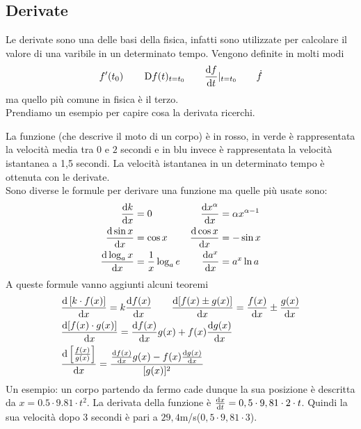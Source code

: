 \subsection{Derivate}
Le derivate sono una delle basi della fisica, infatti sono utilizzate per calcolare il valore di 
una varibile in un determinato tempo. Vengono definite in molti modi 
\begin{equation*}
  f'(t_0) \qquad
  \mathop{}\!\mathrm{D} f(t)_{t=t_0}\qquad
  \frac{\mathop{}\!\mathrm{d} f}{\mathop{}\!\mathrm{d} t}|_{t=t_0}\qquad
  \dot{f}
\end{equation*}
ma quello più comune in fisica è il terzo.\\
Prendiamo un esempio per capire cosa la derivata ricerchi.
\begin{center}
\end{center}
La funzione (che descrive il moto di un corpo) è in rosso, in verde è rappresentata la velocità 
media tra $0$ e $2$ secondi e in blu invece è rappresentata la velocità istantanea a 1,5 secondi. 
La velocità istantanea in un determinato tempo è ottenuta con le derivate.\\
Sono diverse le formule per derivare una funzione ma quelle più usate sono:
\begin{align*}
  \frac{\dif k}{\dif x}&=0 &\quad \frac{\dif x^\alpha}{\dif x}&=\alpha x^{\alpha-1}\\
  \frac{\dif\sin x}{\dif x}&=\cos x & \frac{\dif\cos x}{\dif x}&=-\sin x\\
  \frac{\dif\log_ax}{\dif x}&=\frac{1}{x}\log_ae & \frac{\dif a^{x}}{\dif x}&=a^{x}\ln a
\end{align*}
A queste formule vanno aggiunti alcuni teoremi
\begin{align*}
  &\frac{\dif\left[k\cdot f(x) \right]}{\dif x}=k\frac{\dif f(x)}{\dif x}\qquad
  \frac{\dif[f(x)\pm g(x)]}{\dif x}=\frac{f(x)}{\dif x}\pm \frac{g(x)}{\dif x}\\
  &\frac{\dif [f(x)\cdot g(x)]}{\dif x}=\frac{\dif f(x)}{\dif x}g(x) + 
  f(x)\frac{\dif g(x)}{\dif x}\\
  &\frac{\dif \left[\frac{f(x)}{g(x)}\right]}{\dif x} =
  \frac{\frac{\dif f(x)}{\dif x}g(x)-f(x)\frac{\dif g(x)}{\dif x}}{[g(x)]^2}
\end{align*}
Un esempio: un corpo partendo da fermo cade dunque la sua posizione è descritta da 
$x=0.5\cdot9.81\cdot t^{2}$. La derivata della funzione è 
$\frac{\mathop{}\!\mathrm{d} x}{\mathop{}\!\mathrm{d} t}=0,5\cdot9,81\cdot2\cdot t$. 
Quindi la sua velocità dopo 3 secondi è pari a $29,4$m/s($0,5\cdot9,81\cdot3$).

